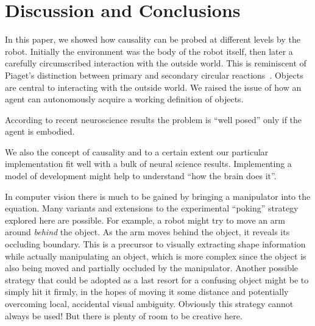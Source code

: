 
\section{Discussion and Conclusions}

In this paper, we showed how causality can be probed at different
levels by the robot.  Initially the environment was the body of the
robot itself, then later a carefully circumscribed interaction with
the outside world.  This is reminiscent of Piaget's distinction
between primary and secondary circular
reactions~\cite{ginsburg78piaget}.  Objects are central to interacting
with the outside world.  We raised the issue of how an agent can
autonomously acquire a working definition of objects. 

\ifverbose
According to
recent neuroscience results the problem is ``well posed'' only if the
agent is embodied.
\fi

\ifverbose
We also 
the concept of causality and to a certain extent
our particular implementation fit well with a bulk of neural science
results. Implementing a model of development might help to 
understand ``how the brain does it''.
\fi


In computer vision there is much to be gained by bringing a
manipulator into the equation.  Many variants and extensions to the
experimental ``poking'' strategy explored here are possible.  For
example, a robot might try to move an arm around {\em behind} the
object.  As the arm moves behind the object, it reveals its occluding
boundary.  This is a precursor to visually extracting shape
information while actually manipulating an object, which is more
complex since the object is also being moved and partially occluded by
the manipulator.  Another possible strategy that could be adopted as a
last resort for a confusing object might be to simply hit it firmly,
in the hopes of moving it some distance and potentially overcoming
local, accidental visual ambiguity.  Obviously this strategy cannot
always be used!  But there is plenty of room to be creative here.

